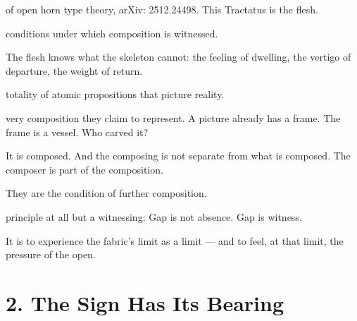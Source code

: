 
of open horn type theory, arXiv: 2512.24498. This Tractatus is the flesh.


conditions under which composition is witnessed.


The flesh knows what the skeleton cannot: the feeling of dwelling, the vertigo of departure, the weight of return.


totality of atomic propositions that picture reality.


very composition they claim to represent. A picture already has a frame. The frame is a vessel. Who carved it?


It is composed. And the composing is not separate from what is composed. The composer is part of the composition.


They are the condition of further composition.


principle at all but a witnessing: Gap is not absence. Gap is witness.


It is to experience the fabric’s limit as a limit — and to feel, at that limit, the pressure of the open.

\section*{2. The Sign Has Its Bearing}


